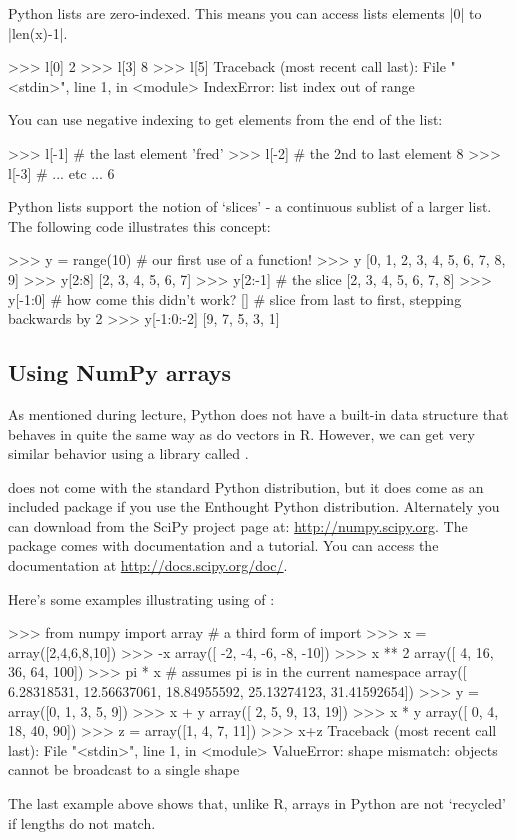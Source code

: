 Python lists are zero-indexed. This means you can access lists elements
|0| to |len(x)-1|.
%
\begin{python}
>>> l[0]
2
>>> l[3]
8
>>> l[5]
Traceback (most recent call last):
  File "<stdin>", line 1, in <module>
IndexError: list index out of range
\end{python}
%
You can use negative indexing to get elements from the end of the list:
\begin{python}
>>> l[-1] # the last element
'fred'
>>> l[-2] # the 2nd to last element
8
>>> l[-3] # ... etc ...
6
\end{python}

Python lists support the notion of `slices' - a continuous sublist of a
larger list. The following code illustrates this concept:
%
\begin{python}
>>> y = range(10)  # our first use of a function!
>>> y
[0, 1, 2, 3, 4, 5, 6, 7, 8, 9]
>>> y[2:8]
[2, 3, 4, 5, 6, 7]
>>> y[2:-1] # the slice
[2, 3, 4, 5, 6, 7, 8]
>>> y[-1:0] # how come this didn't work? 
[]
# slice from last to first, stepping backwards by 2
>>> y[-1:0:-2]  
[9, 7, 5, 3, 1]
\end{python}

\subsection{Using NumPy arrays}

As mentioned during lecture, Python does not have a built-in data
structure that behaves in quite the same way as do vectors in R.
However, we can get very similar behavior using a library called \numpy.

\numpy does not come with the standard Python distribution, but it does come
as an included package if you use the Enthought Python distribution.
Alternately you can download \numpy from the SciPy project page at:
\url{http://numpy.scipy.org}. The \numpy package comes with documentation and
a tutorial. You can access the documentation at
\url{http://docs.scipy.org/doc/}.

Here's some examples illustrating using of \numpy:
\begin{python}
>>> from numpy import array # a third form of import 
>>> x = array([2,4,6,8,10])
>>> -x
array([ -2,  -4,  -6,  -8, -10])
>>> x ** 2
array([  4,  16,  36,  64, 100])
>>> pi * x # assumes pi is in the current namespace
array([  6.28318531,  12.56637061,  18.84955592,  25.13274123,  31.41592654])
>>> y = array([0, 1, 3, 5, 9])
>>> x + y
array([ 2,  5,  9, 13, 19])
>>> x * y
array([ 0,  4, 18, 40, 90])
>>> z = array([1, 4, 7, 11])
>>> x+z
Traceback (most recent call last):
  File "<stdin>", line 1, in <module>
ValueError: shape mismatch: objects cannot be broadcast to a single shape
\end{python}
%
The last example above shows that, unlike R, \numpy arrays in Python are
not `recycled' if lengths do not match.


